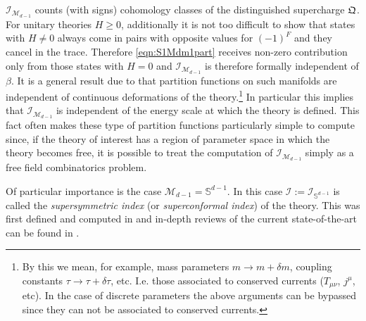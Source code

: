 \documentclass[main.tex]{subfiles}
\begin{document}
$\mathcal{I}_{\mathcal{M}_{d-1}}$ counts (with signs) cohomology classes of the distinguished supercharge $\mathfrak{Q}$.  For unitary theories $H\geq0$, additionally it is not too difficult to show that states with $H\neq0$ always come in pairs with opposite values for $(-1)^F$ and they cancel in the trace.  Therefore \eqref{eqn:S1Mdm1part} receives non-zero contribution only from those states with $H=0$ and $\mathcal{I}_{\mathcal{M}_{d-1}}$ is therefore formally independent of $\beta$.
It is a general result due to \cite{Witten:1982df,Witten:1988ze} that partition functions on such manifolds are independent of continuous deformations of the theory.\footnote{By this we mean, for example, mass parameters $m\to m+\delta m$, coupling constants $\tau\to\tau+\delta \tau$, etc.  I.e.  those associated to conserved currents ($T_{\mu\nu}$, $j^{\mu}$, etc).  In the case of discrete parameters the above arguments can be bypassed since they can not be associated to conserved currents.} In particular this implies that $\mathcal{I}_{\mathcal{M}_{d-1}}$ is independent of the energy scale at which the theory is defined.  This fact often makes these type of partition functions particularly simple to compute since, if the theory of interest has a region of parameter space in which the theory becomes free, it is possible to treat the computation of $\mathcal{I}_{\mathcal{M}_{d-1}}$ simply as a free field combinatorics problem.

Of particular importance is the case $\mathcal{M}_{d-1}=\mathbb{S}^{d-1}$.  In this case $\mathcal{I}:=\mathcal{I}_{\mathbb{S}^{d-1}}$ is called the \textit{supersymmetric index} (or \textit{superconformal index}) of the theory.  This was first defined and computed in \cite{Kinney:2005ej,Romelsberger:2005eg} and in-depth reviews of the current state-of-the-art can be found in \cite{Rastelli:2016tbz,Rastelli:2014jja}.
\end{document}
